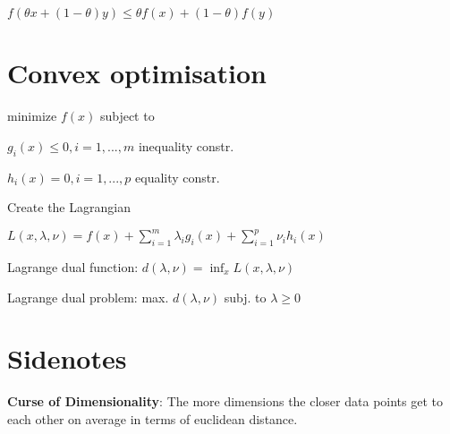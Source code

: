 \documentclass[a4paper,11pt,twocolumn]{article}
\begin{document}
$f(\theta x + (1-\theta)y) \leq \theta f(x) + (1-\theta) f(y)$


\section{Convex optimisation}

minimize $f(x)$ subject to 

$g_i(x) \leq 0, i = 1,...,m$ inequality constr.

$h_i(x) = 0, i = 1,...,p$ equality constr.

Create the Lagrangian

$L(x, \lambda, \nu) = f(x) + \sum_{i=1}^m{\lambda_i g_i(x) + \sum_{i=1}^p{\nu_i h_i(x)}}$

Lagrange dual function: $ d(\lambda, \nu) = \inf_{x} L (x,\lambda, \nu) $

Lagrange dual problem: max. $d(\lambda, \nu)$  subj. to $\lambda \geq 0$

\section{Sidenotes}

\textbf{Curse of Dimensionality}: The more dimensions the closer data points get to each other on average in terms of euclidean distance.
\end{document}

